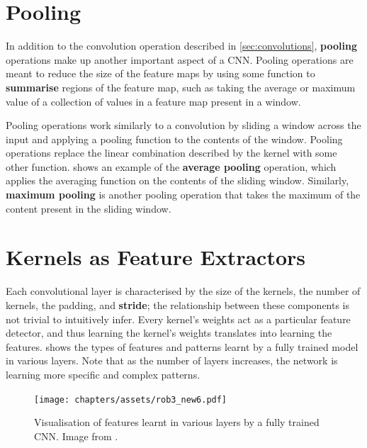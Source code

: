 \section{Pooling}\label{sec:conv-pooling}

In addition to the convolution operation described in \cref{sec:convolutions}, \textbf{pooling} operations make up another important aspect of a CNN. Pooling operations are meant to reduce the size of the feature maps by using some function to \textbf{summarise} regions of the feature map, such as taking the average or maximum value of a collection of values in a feature map present in a window.

Pooling operations work similarly to a convolution by sliding a window across the input and applying a pooling function to the contents of the window. 
Pooling operations replace the linear combination described by the kernel with some other function.  shows an example of the \textbf{average pooling} operation, which applies the averaging function on the contents of the sliding window. Similarly, \textbf{maximum pooling} is another pooling operation that takes the maximum of the content present in the sliding window.

\section{Kernels as Feature Extractors}\label{sec:kernel-feature-extractor}
Each convolutional layer is characterised by the size of the kernels, the number of kernels, the padding, and \textbf{stride}; the relationship between these components is not trivial to intuitively infer. Every kernel's weights act as a particular feature detector, and thus learning the kernel's weights translates into learning the features.  shows the types of features and patterns learnt by a fully trained model in various layers. Note that as the number of layers increases, the network is learning more specific and complex patterns.

\begin{figure}[ht]
    \centering
    \captionsetup{justification=RaggedRight}
    \texttt{[image: chapters/assets/rob3\_new6.pdf]}
    \caption{Visualisation of features learnt in various layers by a fully trained CNN. Image from \textcite{Zeiler2013}.}
    \label{fig:feature-viz}
\end{figure}